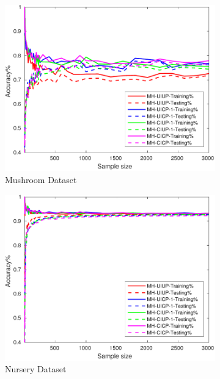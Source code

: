 \begin{figure}[ht]
\begin{subfigure}[b]{0.3\textwidth}
		\centering
  	\includegraphics[width=\textwidth]{figs/PLPTF/Trees/MushroomDownsampled_Trees_MH.pdf}
  	\caption{Mushroom Dataset}
		\label{fig:Mush2}
	\end{subfigure}
  \begin{subfigure}[b]{0.3\textwidth}
		\centering
  	\includegraphics[width=\textwidth]{figs/PLPTF/Trees/NurseryDownsampledFurther_Trees_MH.pdf}
  	\caption{Nursery Dataset}
		\label{fig:N2}
	\end{subfigure}
  \begin{subfigure}[b]{0.3\textwidth}
		\centering

\end{subfigure}
\end{figure}
